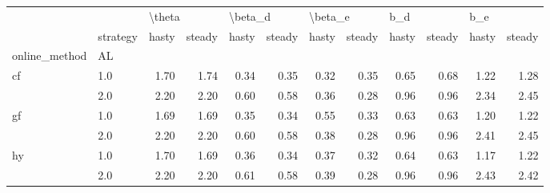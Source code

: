 \begin{tabular}{llrrrrrrrrrr}
\toprule
   & {} & \multicolumn{2}{l}{\textbackslash theta} & \multicolumn{2}{l}{\textbackslash beta\_d} & \multicolumn{2}{l}{\textbackslash beta\_e} & \multicolumn{2}{l}{b\_d} & \multicolumn{2}{l}{b\_e} \\
   & strategy &  hasty & steady &   hasty & steady &   hasty & steady & hasty & steady & hasty & steady \\
online\_method & AL &        &        &         &        &         &        &       &        &       &        \\
\midrule
cf & 1.0 &   1.70 &   1.74 &    0.34 &   0.35 &    0.32 &   0.35 &  0.65 &   0.68 &  1.22 &   1.28 \\
   & 2.0 &   2.20 &   2.20 &    0.60 &   0.58 &    0.36 &   0.28 &  0.96 &   0.96 &  2.34 &   2.45 \\
gf & 1.0 &   1.69 &   1.69 &    0.35 &   0.34 &    0.55 &   0.33 &  0.63 &   0.63 &  1.20 &   1.22 \\
   & 2.0 &   2.20 &   2.20 &    0.60 &   0.58 &    0.38 &   0.28 &  0.96 &   0.96 &  2.41 &   2.45 \\
hy & 1.0 &   1.70 &   1.69 &    0.36 &   0.34 &    0.37 &   0.32 &  0.64 &   0.63 &  1.17 &   1.22 \\
   & 2.0 &   2.20 &   2.20 &    0.61 &   0.58 &    0.39 &   0.28 &  0.96 &   0.96 &  2.43 &   2.42 \\
\bottomrule
\end{tabular}
